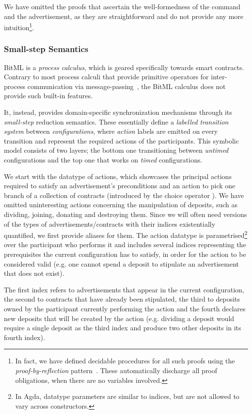 \documentclass[acmsmall,nonacm=true,screen=true]{acmart}
\begin{document}
We have omitted the proofs that ascertain the well-formedness of the \inlinePut{} command and the advertisement, as
they are straightforward and do not provide any more intuition\footnote{
In fact, we have defined decidable procedures for all such proofs using the
\textit{proof-by-reflection} pattern~\cite{proofbyreflection}.
These automatically discharge all proof obligations, when there are no variables involved.}.

\subsubsection{Small-step Semantics}
BitML is a \textit{process calculus}, which is geared specifically towards smart contracts.
Contrary to most process calculi that provide primitive operators for inter-process communication via
message-passing~\cite{csp}, the BitML calculus does not provide such built-in features.

It, instead, provides domain-specific synchronization mechanisms through its \textit{small-step} reduction semantics.
These essentially define a \textit{labelled transition system} between \textit{configurations}, where
\textit{action} labels are emitted on every transition and represent the required actions of the participants.
This symbolic model consists of two layers; the bottom one transitioning between \textit{untimed} configurations and the top one
that works on \textit{timed} configurations.

We start with the datatype of actions, which showcases the principal actions required to satisfy an advertisement's preconditions
and an action to pick one branch of a collection of contracts (introduced by the choice operator \inlineOplus{}).
We have omitted uninteresting actions concerning the manipulation of deposits, such as dividing, joining, donating and destroying them.
Since we will often need versions of the types of advertisements/contracts with their
indices existentially quantified, we first provide aliases for them.
\BITactions{}
The action datatype is parametrised\footnote{
In Agda, datatype parameters are similar to indices, but are not allowed to vary across constructors.
}
over the participant who performs it
and includes several indices representing the prerequisites the current configuration has to satisfy, in order for
the action to be considered valid (e.g. one cannot spend a deposit to stipulate an advertisement that does not exist).

The first index refers to advertisements that appear in the current configuration, the second to contracts that have
already been stipulated, the third to deposits owned by the participant currently performing the action and the fourth
declares new deposits that will be created by the action
(e.g. dividing a deposit would require a single deposit as the third index and produce two other deposits in its fourth index).
\end{document}
